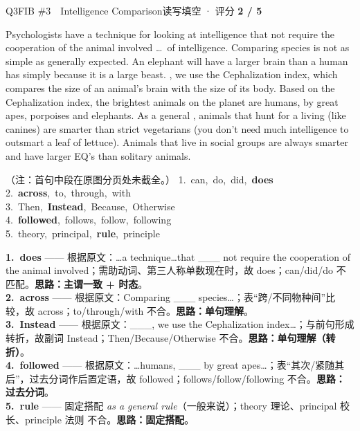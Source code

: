 \begin{qblock}{Q3\quad FIB \#3\ \ Intelligence Comparison}{读写填空 · 评分 \textcolor{cAccent}{\bfseries 2 / 5}}
\begin{promptbox}
Psychologists have a technique for looking at intelligence that  not require the cooperation of the animal involved \dots\ of intelligence. Comparing  species is not as simple as generally expected. An elephant will have a larger brain than a human has simply because it is a large beast. , we use the Cephalization index, which compares the size of an animal's brain with the size of its body. Based on the Cephalization index, the brightest animals on the planet are humans,  by great apes, porpoises and elephants. As a general , animals that hunt for a living (like canines) are smarter than strict vegetarians (you don't need much intelligence to outsmart a leaf of lettuce). Animals that live in social groups are always smarter and have larger EQ's than solitary animals.
\end{promptbox}
{\footnotesize\color{gray}（注：首句中段在原图分页处未截全。）}
{\small
1.\ can,\ do,\ did,\ \textbf{does}\\
2.\ \textbf{across},\ to,\ through,\ with\\
3.\ Then,\ \textbf{Instead},\ Because,\ Otherwise\\
4.\ \textbf{followed},\ follows,\ follow,\ following\\
5.\ theory,\ principal,\ \textbf{rule},\ principle}
\begin{notebox}\footnotesize
\textbf{1.\ does} —— 根据原文：…a technique…that \_\_\_ not require the cooperation of the animal involved；需助动词、第三人称单数现在时，故 does；can/did/do 不匹配。\textbf{思路：主谓一致 + 时态}。\\[2pt]
\textbf{2.\ across} —— 根据原文：Comparing \_\_\_ species…；表“跨/不同物种间”比较，故 across；to/through/with 不合。\textbf{思路：单句理解}。\\[2pt]
\textbf{3.\ Instead} —— 根据原文：\_\_\_, we use the Cephalization index…；与前句形成转折，故副词 Instead；Then/Because/Otherwise 不合。\textbf{思路：单句理解（转折）}。\\[2pt]
\textbf{4.\ followed} —— 根据原文：…humans, \_\_\_ by great apes…；表“其次/紧随其后”，过去分词作后置定语，故 followed；follows/follow/following 不合。\textbf{思路：过去分词}。\\[2pt]
\textbf{5.\ rule} —— 固定搭配 \emph{as a general rule}（一般来说）；theory 理论、principal 校长、principle 法则 不合。\textbf{思路：固定搭配}。
\end{notebox}
\end{qblock}

